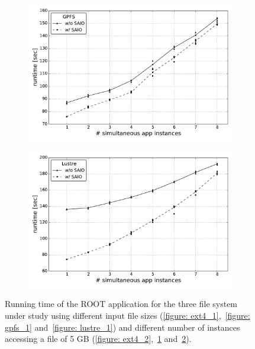 \begin{figure}[!htb]
\begin{subfigure}[b]{0.32\textwidth}
    \includegraphics[width=\textwidth]{chapters/chapter2/figures/SC2015/ROOT/cluster/multiple_instances/simult_instance_gpfs_test_cluster}
    \caption{\textit{}}
    \label{figure: gpfs_2}
  \end{subfigure}
  \begin{subfigure}[b]{0.32\textwidth}
    \centering
    \includegraphics[width=\textwidth]{chapters/chapter2/figures/SC2015/ROOT/cluster/multiple_instances/multiple_simult_procs_Lustre_testcluster}
    \caption{\textit{}}
    \label{figure: lustre_2}
  \end{subfigure}
  \caption{Running time of the ROOT application for the three file system under study using different input file sizes (\ref{figure: ext4_1},~\ref{figure: gpfs_1} and~\ref{figure: lustre_1}) and different number of instances accessing a file of 5 GB (\ref{figure: ext4_2},~\ref{figure: gpfs_2} and~\ref{figure: lustre_2}).}
  \label{figure: runtime}
\end{figure}
